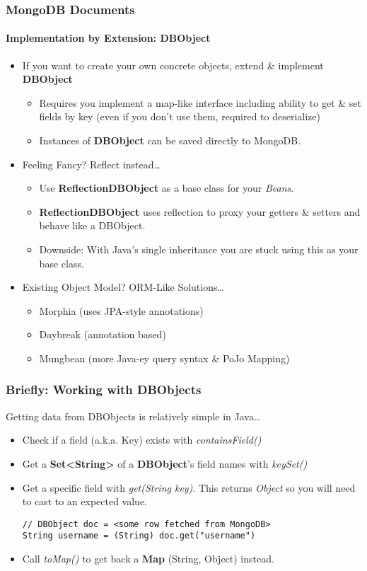 \documentclass{beamer}
\begin{document}
\begin{frame}
\frametitle{MongoDB Documents}
\framesubtitle{Implementation by Extension: DBObject}
    \begin{itemize}
        \item<1-> If you want to create your own concrete objects, extend \& implement {\bf DBObject}
            \begin{itemize}
                \item Requires you implement a map-like interface including ability to get \& set fields by key (even if you don't use them, required to deserialize)
                \item Instances of {\bf DBObject} can be saved directly to MongoDB.
            \end{itemize}
        \item<2-> Feeling Fancy? Reflect instead\dots
            \begin{itemize}
                \item Use {\bf ReflectionDBObject} as a base class for your {\em Beans}.
                \item {\bf ReflectionDBObject} uses reflection to proxy your getters \& setters and behave like a DBObject.
                \item Downside: With Java's single inheritance you are stuck using this as your base class.
            \end{itemize}
        \item<3-> Existing Object Model? ORM-Like Solutions\ldots
            \begin{itemize}
                \item Morphia (uses JPA-style annotations)
                \item Daybreak (annotation based)
                \item Mungbean (more Java-ey query syntax \& PoJo Mapping)
            \end{itemize}
              
    \end{itemize}
\end{frame}

\begin{frame}[fragile]
\frametitle{Briefly: Working with DBObjects}
    Getting data from DBObjects is relatively simple in Java\ldots
    \begin{itemize}
        \item<2-> Check if a field (a.k.a. Key) exists with {\em containsField()}
        \item<3-> Get a {\bf Set<String>} of a {\bf DBObject}'s field names with {\em keySet()}
        \item<4-> Get a specific field with {\em get(String key)}.  This returns {\em Object} so you will need to cast to an expected value.
\begin{lstlisting}
// DBObject doc = <some row fetched from MongoDB>
String username = (String) doc.get("username")
\end{lstlisting}
        \item<5-> Call {\em toMap()} to get back a {\bf Map} (String, Object) instead.
    \end{itemize}
\end{frame}
\end{document}
